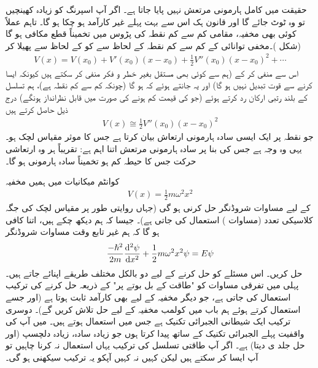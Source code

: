 حقیقت میں کامل ہارمونی مرتعش نہیں پایا جاتا ہے۔ اگر آپ اسپرنگ کو زیادہ کھینچیں تو وہ ٹوٹ جائے گا اور قانون ہک اس سے بہت پہلے غیر کارآمد ہو چکا ہو گا۔ تاہم عملاً کوئی بھی مخفیہ، مقامی کم سے کم نقطہ کی پڑوس میں تخمیناً قطع مکافی
 ہو گا (شکل )۔مخفی توانائی  کے کم سے کم نقطہ  کے لحاظ سے  کو  کے لحاظ سے پھیلا کر
\begin{align*}
V(x)=V( x_{0})+V'(x_{0})(x-x_{0})+\frac{1}{2}V''(x_{0})(x-x_{0})^{2}+\cdots
\end{align*}
اس سے  منفی کر کے (ہم  سے کوئی بھی مستقل بغیر خطر و فکر منفی کر سکتے ہیں کیونکہ ایسا کرنے سے قوت تبدیل نہیں ہو گا) اور یہ جانتے ہوئے کہ  ہو گا (چونکہ  کم سے کم نقطہ ہے)، ہم تسلسل کے بلند رتبی ارکان رد کرتے ہوئے (جو  کی قیمت کم ہونے کی صورت میں قابل نظرانداز ہونگے) درج ذیل حاصل کرتے ہیں
\begin{align*}
V(x)\cong\frac{1}{2}V''(x_{0})(x-x_{0})^{2}
\end{align*}
جو نقطہ  پر ایک ایسی سادہ ہارمونی ارتعاش بیان کرتا ہے جس کا موثر مقیاس لچک  ہو۔ یہی وہ وجہ ہے جس کی بنا پر سادہ ہارمونی مرتعش اتنا اہم ہے: تقریباً ہر وہ ارتعاشی حرکت جس کا حیطہ کم ہو تخمیناً سادہ ہارمونی ہو گا۔

کوانٹم میکانیات میں ہمیں مخفیہ
\begin{align}\label{مساوات_شروڈنگر_مخفیہ_ہارمونی}
V(x)=\frac{1}{2}m\omega ^{2}x^{2}
\end{align}
کے لیے مساوات شروڈنگر حل کرنی ہو گی (جہاں روایتی طور پر مقیاس لچک کی جگہ کلاسیکی تعدد (مساوات ) استعمال کی جاتی ہے)۔ جیسا کہ ہم دیکھ چکے ہیں، اتنا کافی ہو گا کہ ہم غیر تابع وقت مساوات شروڈنگر
\begin{align}\label{مساوات_شروڈنگر_مخفی_قوہ_الف}
\frac{-\hslash ^{2}}{2m}\frac{\dif{^{2}\psi}}{\dif{x^{2}}}+\frac{1}{2}m\omega ^{2}x^{2}\psi=E\psi
\end{align}
حل کریں۔ اس مسئلے کو حل کرنے کے لیے دو بالکل مختلف طریقے اپنائے جاتے ہیں۔ پہلی میں تفرقی مساوات کو "طاقت کے بل بوتے پر"  کے ذریعہ حل کرنے کی ترکیب استعمال کی جاتی ہے، جو دیگر مخفیہ کے لیے بھی کارآمد ثابت ہوتا ہے (اور جسے استعمال کرتے ہوئے ہم باب  میں کولمب مخفیہ کے لیے حل تلاش کریں گے)۔ دوسری ترکیب ایک شیطانی الجبرائی تکنیک ہے جس میں  استعمال ہوتے ہیں۔ میں آپ کی واقفیت پہلے الجبرائی تکنیک کے ساتھ پیدا کرتا ہوں جو زیادہ سادہ، زیادہ دلچسپ (اور حل جلد ی دیتا) ہے۔ اگر آپ طاقتی تسلسل کی ترکیب یہاں استعمال نہ کرنا چاہیں تو آپ ایسا کر سکتے ہیں لیکن کہیں نہ کہیں آپکو یہ ترکیب سیکھنی ہو گی۔

